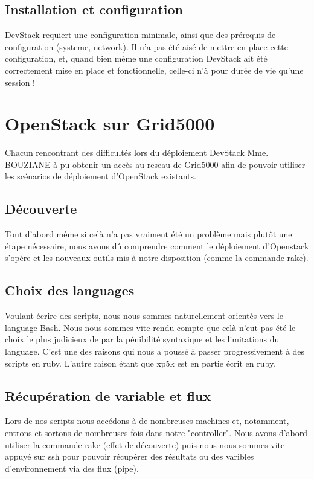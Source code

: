 \documentclass{report}
\begin{document}
        \subsection{Installation et configuration}
            DevStack requiert une configuration minimale, ainsi que des prérequis de configuration (systeme, network).\bigbreak
            Il n'a pas été aisé de mettre en place cette configuration, et, quand bien même une configuration 
            DevStack ait été correctement mise en place et fonctionnelle, celle-ci n'à pour durée de vie qu'une session !\bigbreak

    \section{OpenStack sur Grid5000}
        Chacun rencontrant des difficultés lors du déploiement DevStack Mme. BOUZIANE à pu obtenir un accès au reseau 
        de Grid5000 afin de pouvoir utiliser les scénarios de déploiement d'OpenStack existants.\bigbreak
        \subsection{Découverte}
            Tout d'abord même si celà n'a pas vraiment été un problème mais plutôt une étape nécessaire, nous avons dû comprendre comment le déploiement d'Openstack s'opère et les nouveaux outils mis à notre disposition (comme la commande rake).\bigbreak
        \subsection{Choix des languages}
            Voulant écrire des scripts, nous nous sommes naturellement orientés vers le language Bash. Nous nous sommes vite rendu compte que celà n'eut pas été le choix le plus judicieux de par la pénibilité syntaxique et les limitations du language. C'est une des raisons qui nous a poussé à passer progressivement à des scripts en ruby. L'autre raison étant que xp5k est en partie écrit en ruby.\bigbreak
        \subsection{Récupération de variable et flux}
            Lors de nos scripts nous accédons à de nombreuses machines et, notamment, entrons et sortons de nombreuses fois dans notre "controller". Nous avons d'abord utiliser la commande rake (effet de découverte) puis nous nous sommes vite appuyé sur ssh pour pouvoir récupérer des résultats ou des varibles d'environnement via des flux (pipe).\bigbreak
            
\end{document}
